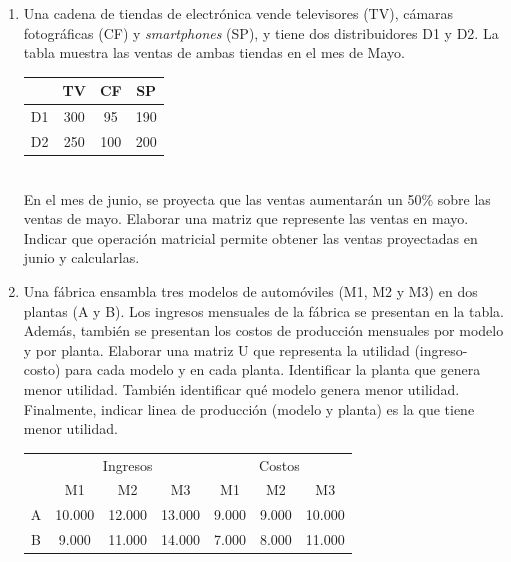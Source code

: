 \documentclass[a4paper]{article}
\begin{document}
\begin{enumerate}
\begin{enumerate} [label=(\alph*)]
		\item Una cadena de tiendas de electrónica vende televisores (TV), cámaras fotográficas (CF) y \textit{smartphones} (SP), y tiene dos distribuidores D1 y D2. La tabla muestra las ventas de ambas tiendas en el mes de Mayo. \\ \vspace{-5mm} \begin{center} \begin{tabular}{l|c|c|c|} \cline{2-4} & TV  & CF  & SP  \\ \hline \multicolumn{1}{|l|}{D1} & 300 & 95  & 190 \\ \hline\multicolumn{1}{|l|}{D2} & 250 & 100 & 200 \\ \hline \end{tabular} \end{center} \\ En el mes de junio, se proyecta que las ventas aumentarán un 50\% sobre las ventas de mayo. Elaborar una matriz que represente las ventas en mayo. Indicar que operación matricial permite obtener las ventas proyectadas en junio y calcularlas.  
		\item Una fábrica ensambla tres modelos de automóviles (M1, M2 y M3) en dos plantas (A y B). Los ingresos mensuales de la fábrica se presentan en la tabla. Además, también se presentan los costos de producción mensuales por modelo y por planta. Elaborar una matriz U que representa la utilidad (ingreso-costo) para cada modelo y en cada planta. Identificar la planta que genera menor utilidad. También identificar qué modelo genera menor utilidad. Finalmente, indicar linea de producción (modelo y planta) es la que tiene menor utilidad. \\ \vspace{-5mm} \begin{center} \begin{tabular}{l|ccc|ccc|} \cline{2-7} & \multicolumn{3}{c|}{Ingresos} & \multicolumn{3}{c|}{Costos} \\ \cline{2-7}  & \multicolumn{1}{c|}{M1} & \multicolumn{1}{c|}{M2}     & M3     & \multicolumn{1}{c|}{M1}    & \multicolumn{1}{c|}{M2}    & M3     \\ \hline \multicolumn{1}{|c|}{A} & \multicolumn{1}{c|}{10.000} & \multicolumn{1}{c|}{12.000} & 13.000 & \multicolumn{1}{c|}{9.000} & \multicolumn{1}{c|}{9.000} & 10.000 \\ \hline \multicolumn{1}{|c|}{B} & \multicolumn{1}{c|}{9.000}  & \multicolumn{1}{c|}{11.000} & 14.000 & \multicolumn{1}{c|}{7.000} & \multicolumn{1}{c|}{8.000} & 11.000 \\ \hline \end{tabular} \end{center}

\end{enumerate}
\end{enumerate}
\end{document}
